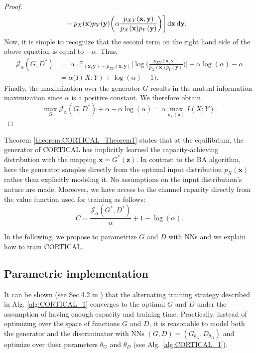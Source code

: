\begin{proof}
\begin{align}
& - p_{X}(\mathbf{x}) p_Y(\mathbf{y}) \biggl(\alpha \frac{p_{XY}(\mathbf{x},\mathbf{y})}{p_{X}(\mathbf{x}) p_Y(\mathbf{y})}\biggr)\biggr] \mathop{}\!\mathrm{d} \mathbf{x} \mathop{}\!\mathrm{d} \mathbf{y}.
\end{align}
Now, it is simple to recognize that the second term on the right hand side of the above equation is equal to $-\alpha$. Thus, 
\begin{align}
\mathcal{J}_{\alpha}(G,D^*) & = \; \alpha \cdot \mathbb{E}_{(\mathbf{x},\mathbf{y}) \sim p_{XY}(\mathbf{x},\mathbf{y})}\biggl[\log \biggl(\frac{p_{XY}(\mathbf{x},\mathbf{y})}{p_{X}(\mathbf{x}) p_Y(\mathbf{y})} \biggr)\biggr]  + \alpha \log(\alpha) - \alpha \nonumber \\
& = \alpha \bigl(I(X;Y)+\log(\alpha)-1\bigr).
\end{align}
Finally, the maximization over the generator $G$ results in the mutual information maximization since $\alpha$ is a positive constant. We therefore obtain,  
\begin{equation}
\max_{G} \mathcal{J}_{\alpha}(G,D^*)  + \alpha - \alpha \log(\alpha) = \alpha \max_{p_X(\mathbf{x})} {I}(X;Y).
\end{equation}
\end{proof}
Theorem \ref{theorem:CORTICAL_Theorem1} states that at the equilibrium, the generator of CORTICAL has implicitly learned the capacity-achieving distribution with the mapping $\mathbf{x}=G^*(\mathbf{z})$. 
In contrast to the BA algorithm, here the generator samples directly from the optimal input distribution $p_X(\mathbf{x})$ rather than explicitly modeling it. No assumptions on the input distribution's nature are made. Moreover, we have access to the channel capacity directly from the value function used for training as follows:
\begin{equation}
    \label{eq:CORTICAL_capacity}
    C = \frac{\mathcal{J}_{\alpha}(G^*,D^*)}{\alpha} + 1- \log(\alpha).
\end{equation}

In the following, we propose to parametrize $G$ and $D$ with NNs and we explain how to train CORTICAL.

\subsection{Parametric implementation}
\label{subsec:cortical_implementation}
It can be shown (see Sec.4.2 in \cite{Goodfellow2014}) that the alternating training strategy described in Alg. \ref{alg:CORTICAL_1}
converges to the optimal $G$ and $D$ under the assumption of having enough capacity and training time. Practically, instead of optimizing over the space of functions $G$ and $D$, it is reasonable to model both the generator and the discriminator with NNs $(G,D)=(G_{\theta_G},D_{\theta_D})$ and optimize over their parameters $\theta_G$ and $\theta_D$ (see Alg. \ref{alg:CORTICAL_1}).

